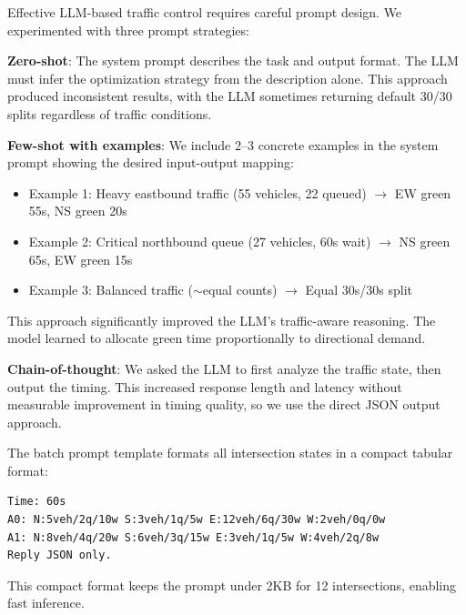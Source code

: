 \documentclass[conference]{IEEEtran}
\begin{document}
Effective LLM-based traffic control requires careful prompt design. We experimented with three prompt strategies:

\textbf{Zero-shot}: The system prompt describes the task and output format. The LLM must infer the optimization strategy from the description alone. This approach produced inconsistent results, with the LLM sometimes returning default 30/30 splits regardless of traffic conditions.

\textbf{Few-shot with examples}: We include 2--3 concrete examples in the system prompt showing the desired input-output mapping:
\begin{itemize}[nosep]
    \item Example 1: Heavy eastbound traffic (55 vehicles, 22 queued) $\rightarrow$ EW green 55s, NS green 20s
    \item Example 2: Critical northbound queue (27 vehicles, 60s wait) $\rightarrow$ NS green 65s, EW green 15s
    \item Example 3: Balanced traffic ($\sim$equal counts) $\rightarrow$ Equal 30s/30s split
\end{itemize}

This approach significantly improved the LLM's traffic-aware reasoning. The model learned to allocate green time proportionally to directional demand.

\textbf{Chain-of-thought}: We asked the LLM to first analyze the traffic state, then output the timing. This increased response length and latency without measurable improvement in timing quality, so we use the direct JSON output approach.

The batch prompt template formats all intersection states in a compact tabular format:
\begin{verbatim}
Time: 60s
A0: N:5veh/2q/10w S:3veh/1q/5w E:12veh/6q/30w W:2veh/0q/0w
A1: N:8veh/4q/20w S:6veh/3q/15w E:3veh/1q/5w W:4veh/2q/8w
Reply JSON only.
\end{verbatim}

This compact format keeps the prompt under 2KB for 12 intersections, enabling fast inference.
\end{document}
